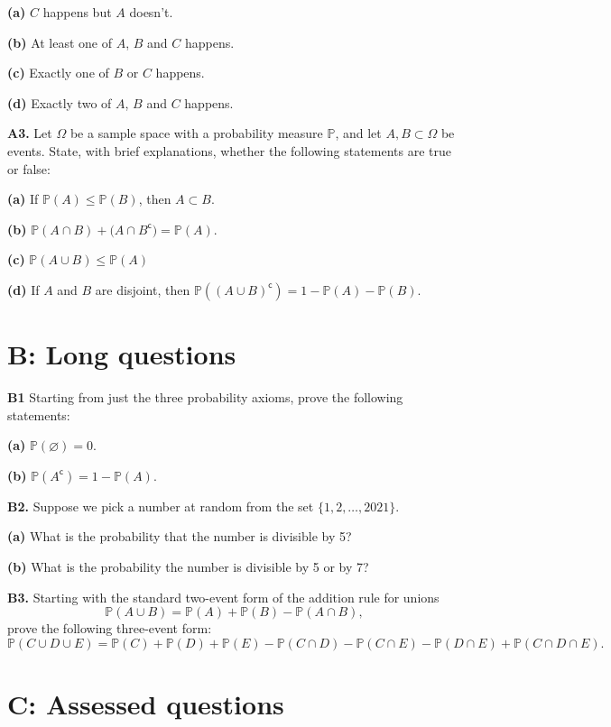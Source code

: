 \documentclass[
  a4paper,
]{book}
\theoremstyle{definition}
\theoremstyle{definition}
\theoremstyle{definition}
\theoremstyle{definition}
\theoremstyle{remark}
\begin{document}
\textbf{(a)} \(C\) happens but \(A\) doesn't.

\textbf{(b)} At least one of \(A\), \(B\) and \(C\) happens.

\textbf{(c)} Exactly one of \(B\) or \(C\) happens.

\textbf{(d)} Exactly two of \(A\), \(B\) and \(C\) happens.

\textbf{A3.} Let \(\Omega\) be a sample space with a probability measure \(\mathbb P\), and let \(A, B \subset \Omega\) be events. State, with brief explanations, whether the following statements are true or false:

\textbf{(a)} If \(\mathbb P(A) \leq \mathbb P(B)\), then \(A \subset B\).

\textbf{(b)} \(\mathbb P(A \cap B) + \mathbb (A \cap B^\mathsf{c}) = \mathbb P(A)\).

\textbf{(c)} \(\mathbb P(A \cup B) \leq \mathbb P(A)\)

\textbf{(d)} If \(A\) and \(B\) are disjoint, then \(\mathbb P((A \cup B)^\mathsf{c}) = 1 - \mathbb P(A) - \mathbb P(B)\).

\hypertarget{P2-long}{%
\section*{B: Long questions}\label{P2-long}}

\textbf{B1} Starting from just the three probability axioms, prove the following statements:

\textbf{(a)} \(\mathbb P(\varnothing) = 0\).

\textbf{(b)} \(\mathbb P(A^\mathsf{c}) = 1 - \mathbb P(A)\).

\textbf{B2.} Suppose we pick a number at random from the set \(\{1, 2, \dots, 2021\}\).

\textbf{(a)} What is the probability that the number is divisible by 5?

\textbf{(b)} What is the probability the number is divisible by 5 or by 7?

\textbf{B3.} Starting with the standard two-event form of the addition rule for unions
\[ \mathbb P(A \cup B) = \mathbb P(A) + \mathbb P(B) - \mathbb P(A \cap B) , \]
prove the following three-event form:
\[
  \mathbb P(C \cup D \cup E) = \mathbb P(C) + \mathbb P(D) + \mathbb P(E) 
  - \mathbb P(C \cap D) - \mathbb P(C \cap E) - \mathbb P(D \cap E) + \mathbb P(C \cap D \cap E) .
\]

\hypertarget{P2-assessed}{%
\section*{C: Assessed questions}\label{P2-assessed}}
\end{document}
